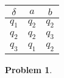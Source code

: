 \documentclass[11pt]{article}
\theoremstyle{definition}
\theoremstyle{case}
\theoremstyle{theorem}
\newtheorem{prob}{Problem}
\begin{document}
\begin{tabular}{|c||c|c|}

$\delta$ & $a$ & $b$ \\

\hline

$q_1$ & $q_2$ & $q_2$ \\

\hline 

$q_2$ & $q_2$ & $q_3$ \\

\hline

$q_3$ & $q_1$ & $q_2$

\end{tabular}

\vspace{15px}

\newpage

\begin{prob}\end{prob}



\end{document}

